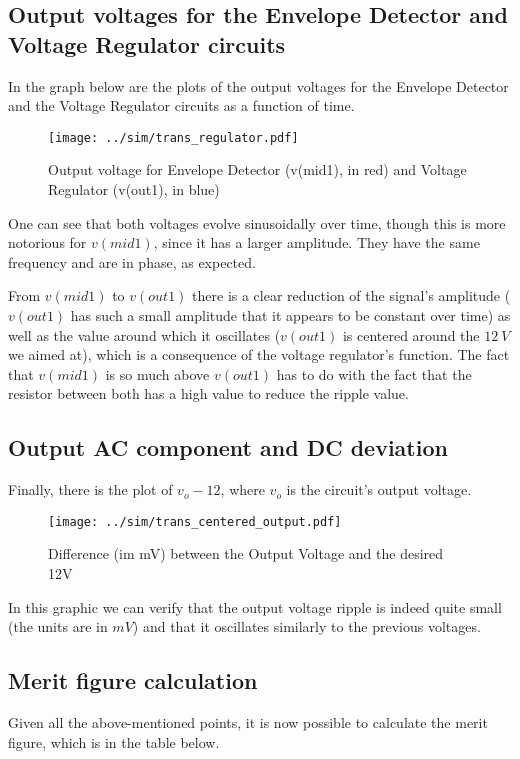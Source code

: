 \subsection{Output voltages for the Envelope Detector and Voltage Regulator circuits}
In the graph below are the plots of the output voltages for the Envelope Detector and the Voltage Regulator circuits as a function of time.

\begin{figure}[H] \centering
\texttt{[image: ../sim/trans\_regulator.pdf]}
\caption{Output voltage for Envelope Detector (v(mid1), in red) and Voltage Regulator (v(out1), in blue)}
\label{fig:phase_sim}
\end{figure}


One can see that both voltages evolve sinusoidally over time, though this is more notorious for $v(mid1)$, since it has a larger amplitude. They have the same frequency and are in phase, as expected.

From $v(mid1)$ to $v(out1)$ there is a clear reduction of the signal's amplitude ($v(out1)$ has such a small amplitude that it appears to be constant over time) as well as the value around which it oscillates ($v(out1)$ is centered around the $12 \ V$ we aimed at), which is a consequence of the voltage regulator's function.
The fact that $v(mid1)$ is so much above $v(out1)$ has to do with the fact that the resistor between both has a high value to reduce the ripple value.




\subsection{Output AC component and DC deviation}
Finally, there is the plot of $v_o - 12$, where $v_o$ is the circuit's output voltage.

\begin{figure}[H] \centering
\texttt{[image: ../sim/trans\_centered\_output.pdf]}
\caption{Difference (im mV) between the Output Voltage and the desired 12V}
\label{fig:phase_sim}
\end{figure}

In this graphic we can verify that the output voltage ripple is indeed quite small (the units are in $mV$) and that it oscillates similarly to the previous voltages.




\subsection{Merit figure calculation}
Given all the above-mentioned points, it is now possible to calculate the merit figure, which is in the table below.

